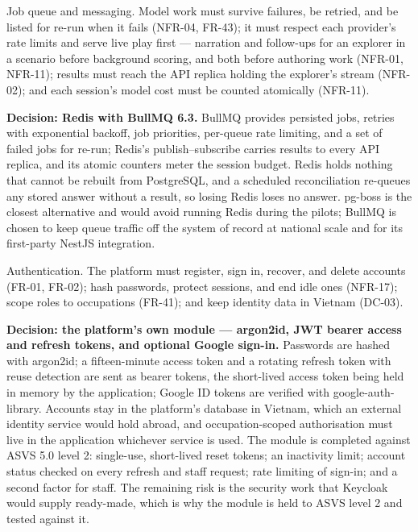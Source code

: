 Job queue and messaging. Model work must survive failures, be retried, and be listed for re-run when it fails (NFR-04, FR-43); it must respect each provider's rate limits and serve live play first --- narration and follow-ups for an explorer in a scenario before background scoring, and both before authoring work (NFR-01, NFR-11); results must reach the API replica holding the explorer's stream (NFR-02); and each session's model cost must be counted atomically (NFR-11).

\textbf{Decision: Redis with BullMQ 6.3.} BullMQ provides persisted jobs, retries with exponential backoff, job priorities, per-queue rate limiting, and a set of failed jobs for re-run\cite{r154}; Redis's publish--subscribe carries results to every API replica, and its atomic counters meter the session budget. Redis holds nothing that cannot be rebuilt from PostgreSQL, and a scheduled reconciliation re-queues any stored answer without a result, so losing Redis loses no answer. pg-boss is the closest alternative and would avoid running Redis during the pilots; BullMQ is chosen to keep queue traffic off the system of record at national scale and for its first-party NestJS integration.

Authentication. The platform must register, sign in, recover, and delete accounts (FR-01, FR-02); hash passwords, protect sessions, and end idle ones (NFR-17); scope roles to occupations (FR-41); and keep identity data in Vietnam (DC-03).

\textbf{Decision: the platform's own module --- argon2id, JWT bearer access and refresh tokens, and optional Google sign-in.} Passwords are hashed with argon2id\cite{r155}; a fifteen-\allowbreak{}minute access token and a rotating refresh token with reuse detection\cite{r156} are sent as bearer tokens, the short-lived access token being held in memory by the application; Google ID tokens are verified with google-\allowbreak{}auth-\allowbreak{}library. Accounts stay in the platform's database in Vietnam, which an external identity service would hold abroad, and occupation-\allowbreak{}scoped authorisation must live in the application whichever service is used. The module is completed against ASVS 5.0 level 2\cite{r157}: single-use, short-lived reset tokens; an inactivity limit; account status checked on every refresh and staff request; rate limiting of sign-in; and a second factor for staff. The remaining risk is the security work that Keycloak would supply ready-made, which is why the module is held to ASVS level 2 and tested against it.

